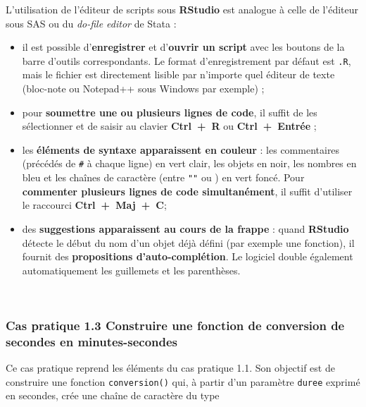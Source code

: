 \documentclass[12pt,twosided, notitlepage]{book}
\providecommand{\tightlist}{%
  \setlength{\itemsep}{0pt}\setlength{\parskip}{0pt}}
\begin{document}
L'utilisation de l'éditeur de scripts sous \textbf{RStudio} est analogue
à celle de l'éditeur sous SAS ou du \emph{do-file editor} de Stata :

\begin{itemize}
\tightlist
\item
  il est possible d'\textbf{enregistrer} et d'\textbf{ouvrir un script}
  avec les boutons de la barre d'outils correspondants. Le format
  d'enregistrement par défaut est \texttt{.R}, mais le fichier est
  directement lisible par n'importe quel éditeur de texte (bloc-note ou
  Notepad++ sous Windows par exemple) ;
\item
  pour \textbf{soumettre une ou plusieurs lignes de code}, il suffit de
  les sélectionner et de saisir au clavier \textbf{Ctrl~+~R} ou
  \textbf{Ctrl~+~Entrée} ;
\item
  les \textbf{éléments de syntaxe apparaissent en couleur} : les
  commentaires (précédés de \texttt{\#} à chaque ligne) en vert clair,
  les objets en noir, les nombres en bleu et les chaînes de caractère
  (entre \texttt{""} ou \texttt{\textquotesingle{}\textquotesingle{}})
  en vert foncé. Pour \textbf{commenter plusieurs lignes de code
  simultanément}, il suffit d'utiliser le raccourci
  \textbf{Ctrl~+~Maj~+~C};
\item
  des \textbf{suggestions apparaissent au cours de la frappe} : quand
  \textbf{RStudio} détecte le début du nom d'un objet déjà défini (par
  exemple une fonction), il fournit des \textbf{propositions
  d'auto-complétion}. Le logiciel double également automatiquement les
  guillemets et les parenthèses.
\end{itemize}

~

\hypertarget{cas-pratique-1.3-construire-une-fonction-de-conversion-de-secondes-en-minutes-secondes}{%
\subsubsection{\texorpdfstring{\textbf{Cas pratique 1.3} Construire une
fonction de conversion de secondes en
minutes-secondes}{Cas pratique 1.3 Construire une fonction de conversion de secondes en minutes-secondes}}\label{cas-pratique-1.3-construire-une-fonction-de-conversion-de-secondes-en-minutes-secondes}}


Ce cas pratique reprend les éléments du cas pratique 1.1. Son objectif
est de construire une fonction \texttt{conversion()} qui, à partir d'un
paramètre \texttt{duree} exprimé en secondes, crée une chaîne de
caractère du type
\end{document}
